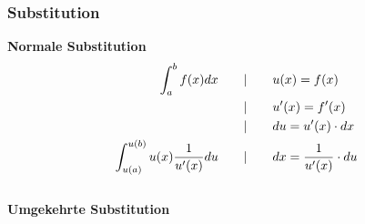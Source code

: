 \subsubsection{Substitution}
\textbf{Normale Substitution}\\
\begin{align}
    \int_{a}^{b} f(x) dx \qquad \large|& \qquad u(x) = f(x)\notag\\
    |& \qquad u'(x) = f'(x)\notag\\
    |& \qquad du = u'(x)\cdot dx\notag\\
    \int_{u(a)}^{u(b)} u(x) \frac{1}{u'(x)} du \qquad \large|& \qquad dx = \frac{1}{u'(x)} \cdot du
\end{align}\\
\textbf{Umgekehrte Substitution}\\

